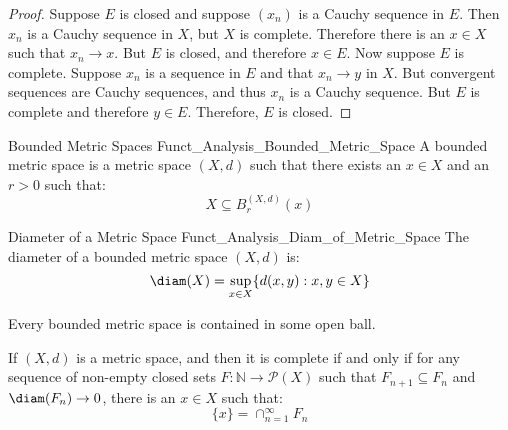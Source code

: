 \documentclass[crop=false,class=book,oneside]{standalone}                      %
\begin{document}
            \begin{proof}
                Suppose $E$ is closed and suppose $(x_{n})$ is a
                Cauchy sequence in $E$. Then $x_{n}$ is a Cauchy
                sequence in $X$, but $X$ is complete. Therefore
                there is an $x\in{X}$ such that
                $x_{n}\rightarrow{x}$. But $E$ is closed,
                and therefore $x\in{E}$. Now suppose $E$ is
                complete. Suppose $x_{n}$ is a sequence in $E$
                and that $x_{n}\rightarrow{y}$ in $X$. But
                convergent sequences are Cauchy sequences, and
                thus $x_{n}$ is a Cauchy sequence. But $E$ is
                complete and therefore $y\in{E}$.
                Therefore, $E$ is closed.
            \end{proof}
            \begin{ldefinition}{Bounded Metric Spaces}
                  {Funct_Analysis_Bounded_Metric_Space}
                A bounded metric space is a metric space
                $(X,d)$ such that there exists an $x\in{X}$
                and an $r>0$ such that:
                \begin{equation}
                    X\subseteq{B}_{r}^{(X,d)}(x)
                \end{equation}
            \end{ldefinition}
            \begin{ldefinition}{Diameter of a Metric Space}
                  {Funct_Analysis_Diam_of_Metric_Space}
                The diameter of a bounded metric space $(X,d)$ is:
                \begin{equation}
                    \diam(X)=\sup_{x\in{X}}\{d(x,y):x,y\in{X}\}
                \end{equation}
            \end{ldefinition}
            Every bounded metric space is contained in some
            open ball.
            \begin{theorem}
                If $(X,d)$ is a metric space, and then it
                is complete if and only if for any sequence
                of non-empty closed sets
                $F:\mathbb{N}\rightarrow\mathcal{P}(X)$ such that
                $F_{n+1}\subseteq{F}_{n}$ and
                $\diam(F_{n})\rightarrow{0}$,
                there is an $x\in{X}$ such that:
                \begin{equation}
                    \{x\}=\cap_{n=1}^{\infty}F_{n}
                \end{equation}
            \end{theorem}
\end{document}
